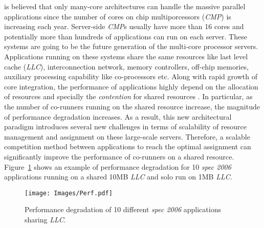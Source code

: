 {} is believed that only many-core architectures can handle the massive parallel applications since the number of cores on chip multiporcessors (\textit{CMP}) is increasing each year. 
Server-side \textit{CMP}s usually have more than 16 cores and potentially more than hundreds of applications can run on each server. These systems are going to be the future generation of the multi-core processor servers. Applications running on these systems share the same resources like last level cache (\textit{LLC}), interconnection network, memory controllers, off-chip memories, auxiliary processing capability like co-processors etc. Along with rapid growth of core integration, the performance of applications highly depend on the allocation of resources and specially the \textit{contention} for shared resources \cite{tang2011impact, zhuravlev2010addressing, hsu2006communist, kim2004fair, cho2006managing, tootaghajICCD, farhat2016stochastic, tootaghaj2016optimal, tootaghaj2015evaluating, farhat2016towardsStoc, tootaghaj2015thesis}. In particular, as the number of co-runners running on the shared resource increase, the magnitude of performance degradation increases. As a result, this new architectural paradigm introduces several new challenges in terms of scalability of resource management and assignment on these large-scale servers. Therefore, a scalable competition method between applications to reach the optimal assignment can significantly improve the performance of co-runners on a shared resource. Figure~\ref{fig:Slow_down} shows an example of performance degradation for 10 \textit{spec 2006} applications running on a shared 10MB \textit{LLC} and solo run on 1MB \textit{LLC}.  \\
\begin{figure}[!tb]
\centering
\texttt{[image: Images/Perf.pdf]} %
\caption{\label{fig:Slow_down} Performance degradation of 10 different \textit{spec 2006} applications sharing \textit{LLC}.}
\end{figure}
